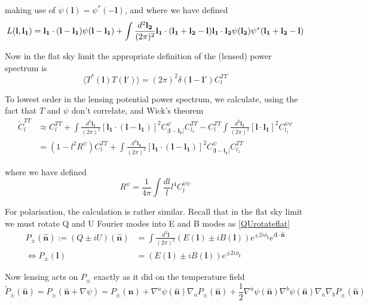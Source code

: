 \documentclass[a4paper,10pt]{article}
\renewcommand{\v}[1]{\mathbf{#1}}
\newcommand{\half}{\frac{1}{2}}
\newcommand{\finttwo}[1]{\int \frac{d^2 \v{#1}}{(2\pi)^2}}
\newcommand{\unit}[1]{\hat{\v{#1}}}
\begin{document}
making use of $\psi(\v{l})=\psi^*(-\v{l})$, and where we have defined 
\begin{equation}
L(\v{l},\v{l_1}) = \v{l_1}\cdot(\v{l}-\v{l_1})\psi(\v{l}-\v{l_1})+\finttwo{l_2}\v{l_1}\cdot(\v{l_1}+\v{l_2}-\v{l})\v{l_1}\cdot\v{l_2}\psi(\v{l_2})\psi^*(\v{l_1}+\v{l_2}-\v{l})\\
\end{equation}

Now in the flat sky limit the appropriate definition of  the (lensed) power spectrum is
\begin{equation}
\langle T^*(\v{l})T(\v{l}')\rangle = (2\pi)^2\delta(\v{l}-\v{l}')C_l^{TT}
\end{equation}

To lowest order in the lensing potential power spectrum, we calculate, using the fact that $T$ and $\psi$ don't correlate, and Wick's theorem
\begin{equation}\begin{split}
\tilde{C}_l^{T T} &\approx C_l^{T T}+\finttwo{l_1}[ \v{l_1}\cdot(\v{l}-\v{l_1})]^2 C^\psi_{|\v{l}-\v{l_1}|}C_{l_1}^{TT} - C_l^{TT}\finttwo{l_1} [\v{l}\cdot\v{l_1}]^2C_{l_1}^{\psi\psi}\\
&=(1-l^2R^\psi)C_l^{TT}+\finttwo{l_1}[ \v{l_1}\cdot(\v{l}-\v{l_1})]^2 C^{\psi}_{|\v{l}-\v{l_1}|}C_{l_1}^{TT}
\end{split}\end{equation}

where we have defined
\begin{equation}
R^\psi = \frac{1}{4\pi}\int \frac{dl}{l} l^4 C_l^{\psi\psi}
\end{equation}

For polarisation, the calculation is rather similar. Recall that in the flat sky limit we must rotate Q and U Fourier modes into E and B modes as \ref{QUrotateflat}
\begin{equation}\begin{split}
 P_{\pm} (\unit{n}) := (Q\pm iU)(\unit{n})  &= \finttwo{l}(E(\v{l})\pm i B(\v{l}))e^{\pm 2i\phi_{\v{l}}}e^{i\v{l}\cdot\unit{n}}\\
\Leftrightarrow  P_{\pm}(\v{l}) &= (E(\v{l})\pm i B(\v{l}))e^{\pm 2i\phi_{\v{l}}}
\label{relationship}
\end{split}\end{equation}

Now lensing acts on $P_{\pm}$ exactly as it did on the temperature field 
\begin{equation}
\tilde{P}_{\pm}(\unit{n}) = P_{\pm}(\unit{n}+\nabla\psi) =P_{\pm}(\unit{n})+\nabla^a\psi(\unit{n})\nabla_aP_{\pm}(\unit{n})+\half\nabla^a\psi(\unit{n})\nabla^b\psi(\unit{n})\nabla_a\nabla_bP_{\pm}(\unit{n})
\end{equation}
\end{document}
